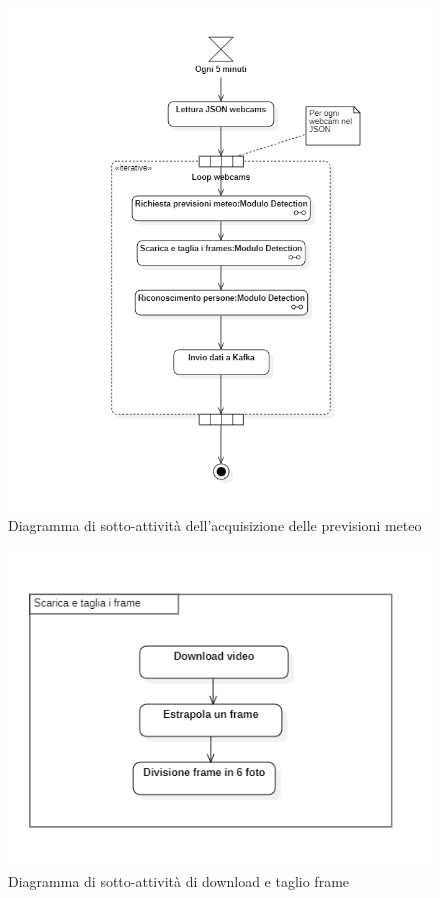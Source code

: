 \begin{figure}[!h]
  \begin{center}
    \includegraphics[width=1\linewidth]{../immagini/diag_PB/detection.png}
    \caption{Diagramma di sotto-attività dell'acquisizione delle previsioni meteo}
  \end{center}
\end{figure}
\begin{figure}[!h]
  \begin{center}
    \includegraphics[width=1\linewidth]{../immagini/diag_PB/download_e_cut_frames.png}
    \caption{Diagramma di sotto-attività di download e taglio frame}
  \end{center}
\end{figure}
